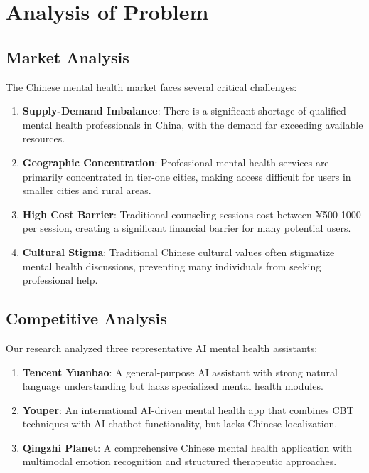 \section{Analysis of Problem}
\label{sec:problem_analysis}

\subsection{Market Analysis}

The Chinese mental health market faces several critical challenges:

\begin{enumerate}
    \item \textbf{Supply-Demand Imbalance}: There is a significant shortage of qualified mental health professionals in China, with the demand far exceeding available resources.
    
    \item \textbf{Geographic Concentration}: Professional mental health services are primarily concentrated in tier-one cities, making access difficult for users in smaller cities and rural areas.
    
    \item \textbf{High Cost Barrier}: Traditional counseling sessions cost between ¥500-1000 per session, creating a significant financial barrier for many potential users.
    
    \item \textbf{Cultural Stigma}: Traditional Chinese cultural values often stigmatize mental health discussions, preventing many individuals from seeking professional help.
\end{enumerate}

\subsection{Competitive Analysis}

Our research analyzed three representative AI mental health assistants:

\begin{enumerate}
    \item \textbf{Tencent Yuanbao}: A general-purpose AI assistant with strong natural language understanding but lacks specialized mental health modules.
    
    \item \textbf{Youper}: An international AI-driven mental health app that combines CBT techniques with AI chatbot functionality, but lacks Chinese localization.
    
    \item \textbf{Qingzhi Planet}: A comprehensive Chinese mental health application with multimodal emotion recognition and structured therapeutic approaches.
\end{enumerate}

